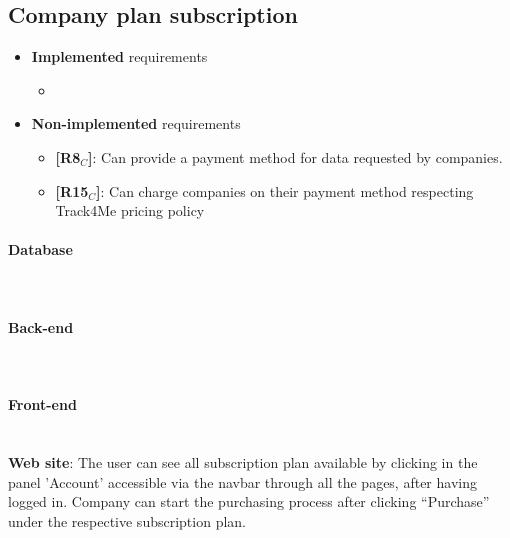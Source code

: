 \subsection{Company plan subscription }
\begin{itemize}
    \item \textbf{Implemented} requirements
        \begin{itemize}
            \item 
        \end{itemize}
    \item \textbf{Non-implemented} requirements
    \begin{itemize}
    \item \textbf{[R8$_C$]}: Can provide a payment method for data requested by companies.
    \item \textbf{[R15$_C$]}: Can charge companies on their payment method respecting Track4Me pricing policy
        \end{itemize}
\end{itemize}

\paragraph{Database} \mbox{}\\ 
\paragraph{Back-end} \mbox{}\\  
\paragraph{Front-end} \mbox{}\\
\textbf{Web site}: The user can see all subscription plan available by clicking in the panel 'Account' accessible via the navbar through all the pages, after having logged in.
Company can start the purchasing process after clicking “Purchase” under the respective subscription plan.

